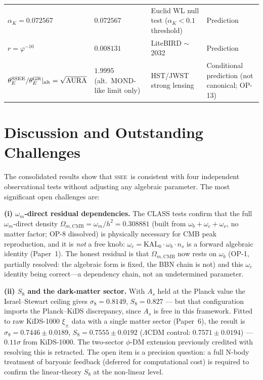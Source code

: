 \documentclass[12pt,a4paper]{article}
\newcommand{\SSEE}{\textsc{ssee}}
\newcommand{\phiG}{\varphi}
\newcommand{\AURA}{\mathrm{AURA}}
\newcommand{\OmmCMB}{\Omega_{m,\mathrm{CMB}}}
\newcommand{\alphaK}{\alpha_K}
\begin{document}
\begin{table}[htbp]
{\begin{tabular}{p{6.0cm}lp{4.0cm}l}
$\alphaK = 0.072567$ & $0.072567$ & Euclid WL null test ($\alphaK < 0.1$ threshold) & Prediction \\
$r = \phiG^{-10}$ & $0.008131$ & LiteBIRD $\sim$2032 & Prediction \\
$\theta_E^{\rm SSEE}/\theta_E^{\rm GR}|_{\rm alt} = \sqrt{\AURA}$ & $1.9995$ (alt.\ MOND-like limit only) & HST/JWST strong lensing & Conditional prediction (not canonical; OP-13) \\
\bottomrule
\end{tabular}%
}
\end{table}


\section{Discussion and Outstanding Challenges}
\label{sec:discussion}

The consolidated results show that \SSEE\ is consistent with four independent
observational tests without adjusting any algebraic parameter.
The most significant open challenges are:

\textbf{(i) $\omega_m$-direct residual dependencies.}
The CLASS tests confirm that the full $\omega_m$-direct density
$\OmmCMB = \omega_m/h^2 = 0.308881$ (built from $\omega_b+\omega_c+\omega_\nu$,
no matter factor; OP-8 dissolved) is physically necessary for CMB peak
reproduction, and it is \emph{not} a free knob: $\omega_c = \mathrm{KAL_0}\cdot\omega_b\cdot n_s$
is a forward algebraic identity (Paper~1). The honest residual is that $\OmmCMB$
now rests on $\omega_b$ (OP-1, partially resolved: the algebraic form is fixed,
the BBN chain is not) and this $\omega_c$ identity being
correct---a dependency chain, not an undetermined parameter.

\textbf{(ii) $S_8$ and the dark-matter sector.}
With $A_s$ held at the Planck value the Israel--Stewart ceiling gives
$\sigma_8 = 0.8149$, $S_8 = 0.827$ --- but that configuration imports the
Planck--KiDS discrepancy, since $A_s$ is free in this framework. Fitted to raw
KiDS-1000 $\xi_\pm$ data with a single matter sector (Paper~6), the result is
$\sigma_8=0.7446\pm0.0189$, $S_8=0.7555\pm0.0192$ ($\Lambda$CDM control: $0.7571\pm0.0194$) --- $0.11\sigma$ from
KiDS-1000. The two-sector $\phi$-DM extension previously credited with
resolving this is retracted. The open item is a precision question:
a full N-body treatment of baryonic feedback (deferred for computational cost) is
required to confirm the linear-theory $S_8$ at the non-linear level.
\end{document}

